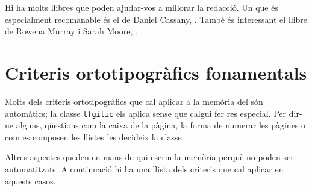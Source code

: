 \documentclass{tfgitic}
\begin{document}
Hi ha molts llibres que poden ajudar-vos a millorar la redacció. Un
que és especialment recomanable és el de Daniel Cassany,
\cite{cassany95:_la_cuina}. També és interessant el llibre de Rowena
Murray i Sarah Moore, \cite{murray06:_handb_academ_writin}.


\chapter{Criteris ortotipogràfics fonamentals}
\label{cap:ortotipografia}


\medskip\noindent
Molts dels criteris ortotipogràfics que cal aplicar a la memòria del
 són automàtics; la classe \texttt{tfgitic} els aplica sense
que calgui fer res especial. Per dir-ne alguns, qüestions com la caixa
de la pàgina, la forma de numerar les pàgines o com es composen les
llistes les decideix la classe.

Altres aspectes queden en mans de qui escriu la memòria perquè no
poden ser automatitzats. A continuació hi ha una llista dels criteris
que cal aplicar en aquests casos.
\end{document}
